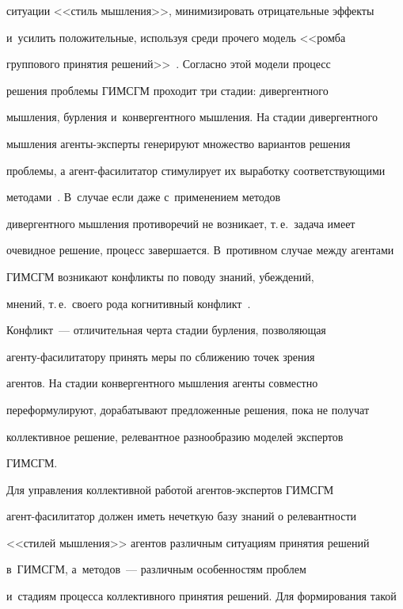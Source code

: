 ситуации <<стиль мышления>>, минимизировать отрицательные эффекты 


и~усилить положительные, используя среди прочего модель <<ромба 


группового принятия решений>>~\cite{8-kl}. Согласно этой модели процесс 


решения проблемы \mbox{ГИМСГМ} проходит три стадии: дивергентного 


мышления, бурления и~конвергентного мышления. На стадии дивергентного 


мышления агенты-эксперты генерируют множество вариантов решения 


проблемы, а агент-фасилитатор стимулирует их выработку соответствующими 


методами~\cite{18-kl}. В~случае если даже с~применением методов 


дивергентного мышления противоречий не возникает, т.\,е.\ задача имеет 


очевидное решение, процесс завершается. В~противном случае между агентами 


\mbox{ГИМСГМ} возникают конфликты по поводу знаний, убеждений, 


мнений, т.\,е.\ своего рода когнитивный конфликт~\cite{18-kl, 19-kl}. 


Конфликт~--- отличительная черта стадии бурления, позволяющая  


аген\-ту-фа\-си\-ли\-та\-то\-ру принять меры по сближению точек зрения 


агентов. На стадии конвергентного мышления агенты совместно 


переформулируют, дорабатывают предложенные решения, пока не получат 


коллективное решение, релевантное разнообразию моделей экспертов 


\mbox{ГИМСГМ}. 








  


  Для управления коллективной работой агентов-экспертов ГИМСГМ  


агент-фа\-си\-ли\-та\-тор должен иметь нечеткую базу знаний о релевантности 


<<стилей мышления>> агентов различным ситуациям принятия решений 


в~\mbox{ГИМСГМ}, а~методов~--- различным особенностям проблем 


и~стадиям процесса коллективного принятия решений. Для формирования такой 


